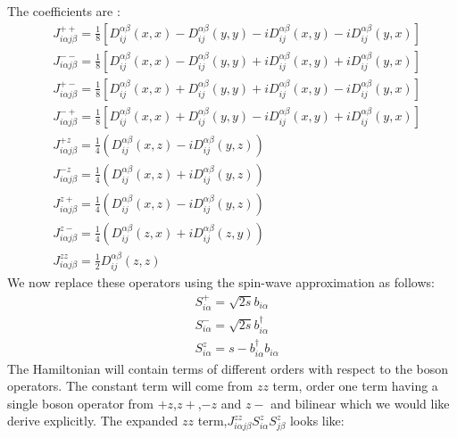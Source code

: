 The coefficients are :
\begin{equation}
\begin{split}
&J^{++}_{i\alpha j\beta} = \frac{1}{8}\left[D^{\alpha \beta}_{ij}(x,x) - D^{\alpha \beta}_{ij}(y,y) - iD^{\alpha \beta}_{ij}(x,y) - iD^{\alpha \beta}_{ij}(y,x) \right]\\
&J^{--}_{i\alpha j\beta} = \frac{1}{8}\left[ D^{\alpha \beta}_{ij}(x,x) - D^{\alpha \beta}_{ij}(y,y) + iD^{\alpha \beta}_{ij}(x,y) + iD^{\alpha \beta}_{ij}(y,x) \right]\\
&J^{+-}_{i\alpha j\beta} = \frac{1}{8} \left[ D^{\alpha \beta}_{ij} (x,x) + D^{\alpha \beta}_{ij}(y,y) + iD^{\alpha \beta}_{ij}(x,y)-iD^{\alpha \beta}_{ij}(y,x) \right]\\
&J^{-+}_{i\alpha j\beta} =\frac{1}{8} \left[ D^{\alpha \beta}_{ij} (x,x) + D^{\alpha \beta}_{ij}(y,y) - iD^{\alpha \beta}_{ij}(x,y)+iD^{\alpha \beta}_{ij}(y,x) \right]\\
&J^{+z}_{i\alpha j\beta} = \frac{1}{4}( D^{\alpha \beta}_{ij}( x,z ) - iD^{\alpha \beta}_{ij}(y,z) )\\
&J^{-z}_{i\alpha j\beta} = \frac{1}{4}( D^{\alpha \beta}_{ij}( x,z ) + iD^{\alpha \beta}_{ij}(y,z) )\\
&J^{z+}_{i\alpha j\beta} = \frac{1}{4}( D^{\alpha \beta}_{ij}( x,z ) - iD^{\alpha \beta}_{ij}(y,z) )\\
&J^{z-}_{i\alpha j\beta} = \frac{1}{4}( D^{\alpha \beta}_{ij}( z,x ) + iD^{\alpha \beta}_{ij}(z,y) )\\
&J^{zz}_{i\alpha j\beta} = \frac{1}{2}D^{\alpha \beta}_{ij}(z,z) 			
\end{split}
\end{equation}
We now replace these operators using the spin-wave approximation as follows:
\begin{equation}
\begin{split}
&S^{+}_{i\alpha} = \sqrt{2s}b_{i\alpha}\\
&S^{-}_{i\alpha} = \sqrt{2s}b_{i\alpha}^\dagger\\
&S^{z}_{i\alpha} = s - b_{i\alpha}^\dagger b_{i\alpha}
\end{split}
\end{equation}
The Hamiltonian will contain terms of different orders with respect to the boson operators. The constant term will come from $ zz $ term, order one term having a single boson operator from $ +z $,$ z+ $,$ -z $ and $ z- $ and bilinear which we would like derive explicitly. The expanded $ zz $ term,$ J^{zz}_{i\alpha j\beta}S^z_{i\alpha}S^z_{j\beta} $ looks like:
